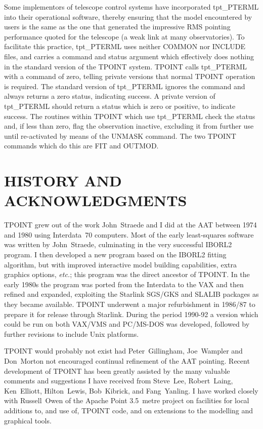 Some implementors of telescope control systems have incorporated
tpt\_PTERML into their operational software, thereby ensuring that
the model encountered by users
is the same as the one that generated
the impressive RMS pointing performance quoted for the telescope
(a weak link at many observatories).
To facilitate this practice, tpt\_PTERML uses neither COMMON nor INCLUDE
files, and carries a command and
status argument which effectively does nothing in
the standard version of the TPOINT system.
TPOINT calls tpt\_PTERML with a command of zero,
telling private versions that normal TPOINT operation is required.
The standard version of
tpt\_PTERML ignores the command and always returns a
zero status, indicating success.  A private version of
tpt\_PTERML should return a status which is zero or positive, to indicate
success.  The routines within TPOINT
which use tpt\_PTERML check the status and, if less than zero,
flag the observation inactive, excluding it from further use until
re-activated by means of the UNMASK command.  The two TPOINT commands
which do this are FIT and OUTMOD.

\section{HISTORY AND ACKNOWLEDGMENTS}
TPOINT grew out of the work John~Straede and I did at the
AAT between 1974 and 1980 using Interdata~70 computers.
Most of the early least-squares software
was written by John~Straede, culminating in
the very successful IBORL2 program. I then developed
a new program based on the IBORL2 fitting algorithm,
but with improved
interactive model building capabilities, extra graphics options,
{\it etc.}; this program was the direct ancestor
of TPOINT.  In the early 1980s the program was ported from
the Interdata to the VAX and then refined and expanded, exploiting the
Starlink SGS/GKS and SLALIB packages as they became available.
TPOINT underwent a major refurbishment in 1986/87 to prepare
it for release through Starlink.  During the period 1990-92 a
version which could be run on both VAX/VMS and PC/MS-DOS was
developed, followed by further revisions to include Unix platforms.

TPOINT would probably not exist had
Peter~Gillingham, Joe~Wampler and Don~Morton not encouraged
continual refinement of the AAT pointing.
Recent development of TPOINT has been greatly assisted by
the many valuable comments and suggestions I
have received from Steve~Lee, Robert~Laing, Ken~Elliott,
Hilton~Lewis, Bob~Kibrick, and Fang~Yanling.  I have worked
closely with Russell~Owen of the Apache Point 3.5~metre project
on facilities for local additions to, and use of, TPOINT code,
and on extensions to the modelling and graphical tools.

